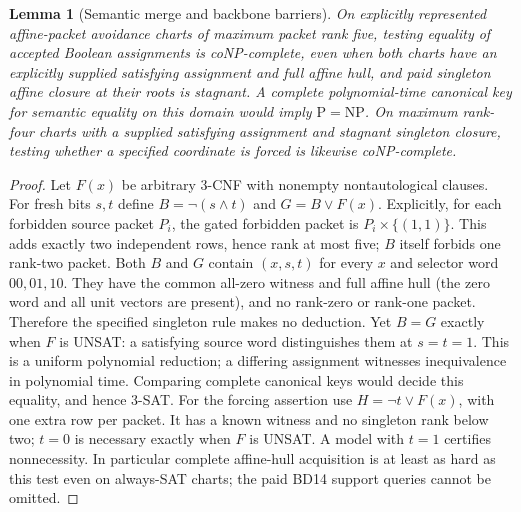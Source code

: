 \documentclass[11pt]{article}
\newtheorem{lemma}[theorem]{Lemma}
\begin{document}
\begin{lemma}[Semantic merge and backbone barriers]\label{lem:dr15-merge}
On explicitly represented affine-packet avoidance charts of maximum packet rank five, testing equality of accepted Boolean assignments is coNP-complete, even when both charts have an explicitly supplied satisfying assignment and full affine hull, and paid singleton affine closure at their roots is stagnant. A complete polynomial-time canonical key for semantic equality on this domain would imply $\mathrm P=\mathrm{NP}$. On maximum rank-four charts with a supplied satisfying assignment and stagnant singleton closure, testing whether a specified coordinate is forced is likewise coNP-complete.
\end{lemma}
\begin{proof}
Let $F(x)$ be arbitrary 3-CNF with nonempty nontautological clauses. For fresh bits $s,t$ define $B=\neg(s\land t)$ and $G=B\lor F(x)$. Explicitly, for each forbidden source packet $P_i$, the gated forbidden packet is $P_i\times\{(1,1)\}$. This adds exactly two independent rows, hence rank at most five; $B$ itself forbids one rank-two packet. Both $B$ and $G$ contain $(x,s,t)$ for every $x$ and selector word $00,01,10$. They have the common all-zero witness and full affine hull (the zero word and all unit vectors are present), and no rank-zero or rank-one packet. Therefore the specified singleton rule makes no deduction. Yet $B=G$ exactly when $F$ is UNSAT: a satisfying source word distinguishes them at $s=t=1$. This is a uniform polynomial reduction; a differing assignment witnesses inequivalence in polynomial time. Comparing complete canonical keys would decide this equality, and hence 3-SAT. For the forcing assertion use $H=\neg t\lor F(x)$, with one extra row per packet. It has a known witness and no singleton rank below two; $t=0$ is necessary exactly when $F$ is UNSAT. A model with $t=1$ certifies nonnecessity. In particular complete affine-hull acquisition is at least as hard as this test even on always-SAT charts; the paid BD14 support queries cannot be omitted.
\end{proof}
\end{document}
